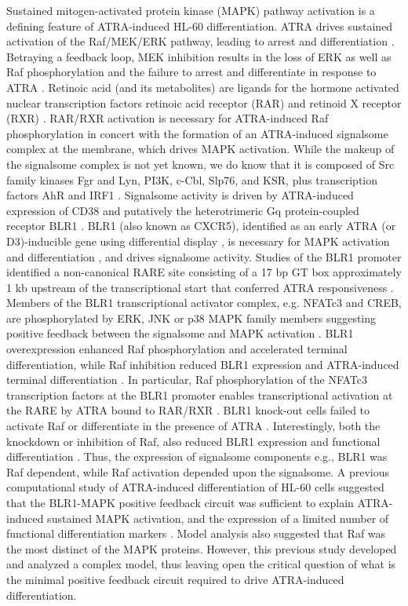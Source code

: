 \documentclass[12pt]{article}
\begin{document}
Sustained mitogen-activated protein kinase (MAPK) pathway activation is a defining feature of ATRA-induced HL-60 differentiation.
ATRA drives sustained activation of the Raf/MEK/ERK pathway, leading to arrest and differentiation \cite{Yen1998}.
Betraying a feedback loop, MEK inhibition results in the loss of ERK as well as Raf phosphorylation and the failure to arrest and differentiate in response to ATRA \cite{Hong2001}.
Retinoic acid (and its metabolites) are ligands for the hormone activated nuclear transcription factors retinoic acid receptor (RAR) and retinoid X receptor (RXR) \cite{Mangelsdorf1990}.
RAR/RXR activation is necessary for ATRA-induced Raf phosphorylation \cite{Hong2001} in concert with
the formation of an ATRA-induced signalsome complex at the membrane, which drives MAPK activation.
While the makeup of the signalsome complex is not yet known,
we do know that it is composed of Src family kinases Fgr and Lyn, PI3K, c-Cbl, Slp76, and KSR, plus transcription factors
AhR and IRF1 \cite{Congleton:2012fk,Shen:2011aa,Shen:2009aa,Yen2006,Marchisio:1998aa}.
Signalsome activity is driven by ATRA-induced expression of CD38 and putatively the heterotrimeric Gq protein-coupled receptor BLR1 \cite{Congleton2011,WANG2004}.
BLR1 (also known as CXCR5), identified as an early ATRA (or D3)-inducible gene using differential display \cite{YEN1990},
is necessary for MAPK activation and differentiation \cite{WANG2004}, and drives signalsome activity.
Studies of the BLR1 promoter identified a non-canonical RARE site consisting of a 17 bp GT box approximately
1 kb upstream of the transcriptional start that conferred ATRA responsiveness \cite{WANG2004}.
Members of the BLR1 transcriptional activator complex, e.g. NFATc3 and CREB,
are phosphorylated by ERK, JNK or p38 MAPK family members suggesting positive feedback between the signalsome and MAPK activation \cite{Yang2002,Li:2017ab}.
BLR1 overexpression enhanced Raf phosphorylation and accelerated terminal differentiation, while Raf inhibition reduced BLR1 expression and ATRA-induced terminal differentiation \cite{Wang2008}.
In particular, Raf phosphorylation of the NFATc3 transcription factors at the BLR1 promoter enables transcriptional activation at the RARE by ATRA bound to RAR/RXR \cite{Geil:2014aa}.
BLR1 knock-out cells failed to activate Raf or differentiate in the presence of ATRA \cite{Wang2008}.
Interestingly, both the knockdown or inhibition of Raf, also reduced BLR1 expression and functional differentiation \cite{Wang2008}.
Thus, the expression of signalsome components e.g., BLR1 was Raf dependent, while Raf activation depended upon the signalsome.
A previous computational study of ATRA-induced differentiation of HL-60 cells suggested that the BLR1-MAPK positive feedback circuit was sufficient
to explain ATRA-induced sustained MAPK activation, and the expression of a limited number of functional differentiation markers \cite{Tasseff2011}.
Model analysis also suggested that Raf was the most distinct of the MAPK proteins.
However, this previous study developed and analyzed a complex model,
thus leaving open the critical question of what is the minimal positive feedback circuit required to drive ATRA-induced differentiation.
\end{document}
